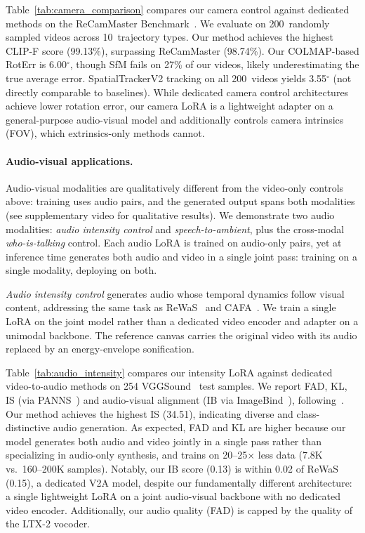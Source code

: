 Table~\ref{tab:camera_comparison} compares our camera control against dedicated methods on the ReCamMaster Benchmark~\cite{bai2025recammaster}. We evaluate on 200~randomly sampled videos across 10~trajectory types. Our method achieves the highest CLIP-F score (99.13\%), surpassing ReCamMaster (98.74\%). Our COLMAP-based RotErr is 6.00$^\circ$, though SfM fails on 27\% of our videos, likely underestimating the true average error. SpatialTrackerV2 tracking on all 200~videos yields 3.55$^\circ$ (not directly comparable to baselines). While dedicated camera control architectures achieve lower rotation error, our camera LoRA is a lightweight adapter on a general-purpose audio-visual model and additionally controls camera intrinsics (FOV), which extrinsics-only methods cannot.

\paragraph{Audio-visual applications.}
\label{sec:av}
Audio-visual modalities are qualitatively different from the video-only controls above: training uses audio pairs, and the generated output spans both modalities (see supplementary video for qualitative results). We demonstrate two audio modalities: \emph{audio intensity control} and \emph{speech-to-ambient}, plus the cross-modal \emph{who-is-talking} control. Each audio LoRA is trained on audio-only pairs, yet at inference time generates both audio and video in a single joint pass: training on a single modality, deploying on both.

\emph{Audio intensity control} generates audio whose temporal dynamics follow visual content, addressing the same task as ReWaS~\cite{jeong2024rewas} and CAFA~\cite{benita2025cafa}. We train a single LoRA on the joint model rather than a dedicated video encoder and adapter on a unimodal backbone. The reference canvas carries the original video with its audio replaced by an energy-envelope sonification.



Table~\ref{tab:audio_intensity} compares our intensity LoRA against dedicated video-to-audio methods on 254 VGGSound~\cite{chen2020vggsound} test samples. We report FAD, KL, IS (via PANNS~\cite{kong2020panns}) and audio-visual alignment (IB via ImageBind~\cite{girdhar2023imagebind}), following~\cite{benita2025cafa}. Our method achieves the highest IS (34.51), indicating diverse and class-distinctive audio generation. As expected, FAD and KL are higher because our model generates both audio and video jointly in a single pass rather than specializing in audio-only synthesis, and trains on 20--25$\times$ less data (7.8K vs.\ 160--200K samples). Notably, our IB score (0.13) is within 0.02 of ReWaS (0.15), a dedicated V2A model, despite our fundamentally different architecture: a single lightweight LoRA on a joint audio-visual backbone with no dedicated video encoder. Additionally, our audio quality (FAD) is capped by the quality of the LTX-2 vocoder.


